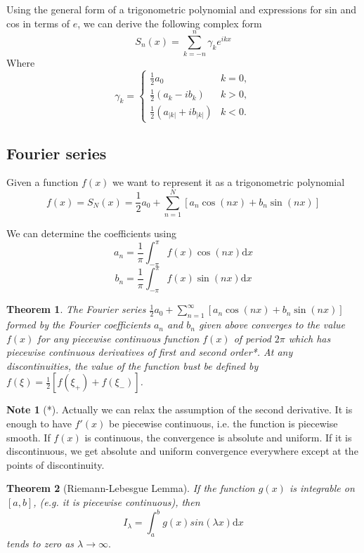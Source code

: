 \documentclass[11pt,a4paper]{article}
\newcommand\dee{\text{d}}
\newtheorem{theorem}{Theorem}
\theoremstyle{definition}
\newtheorem{note}{Note}
\begin{document}
Using the general form of a trigonometric polynomial and expressions for sin and cos in terms of $ e $, we can derive the following complex form 
\[ S_n(x) = \sum_{k = -n}^n \gamma_k e^{ikx}\]
Where
\[ \gamma_k = \begin{cases}
    \frac{1}{2} a_0 & k = 0, \\
    \frac{1}{2} (a_k - i b_k) & k > 0, \\
    \frac{1}{2} (a_{|k|} + i b_{|k|}) & k < 0.
\end{cases}\]

\subsection{Fourier series}
Given a function $ f(x) $ we want to represent it as a trigonometric polynomial
\[ f(x) = S_N(x) = \frac{1}{2} a_0 + \sum_{n = 1}^N \left[a_n \cos(nx) + b_n \sin(nx)\right] \]

We can determine the coefficients using
\[ a_n = \frac{1}{\pi} \int_{-\pi}^\pi f(x)\cos(nx) \dee x\]
\[ b_n = \frac{1}{\pi} \int_{-\pi}^\pi f(x)\sin(nx) \dee x\]

\begin{theorem}
    The Fourier series $ \frac{1}{2} a_0 + \sum_{n = 1}^\infty \left[a_n \cos(nx) + b_n \sin(nx)\right] $ formed by the Fourier coefficients $ a_n $ and $ b_n $ given above converges
    to the value $ f(x) $ for any piecewise continuous function $ f(x) $ of period $ 2\pi $ which has piecewise continuous derivatives of first and second order*. At any 
    discontinuities, the value of the function bust be defined by 
    $ f(\xi) = \frac{1}{2}\left[f(\xi_+) + f(\xi_-)\right] $.
\end{theorem}

\begin{note}[*]
   Actually we can relax the assumption of the second derivative. It is enough to have $ f'(x) $ be piecewise continuous, i.e. the function is piecewise smooth. If $ f(x) $ 
   is continuous, the convergence is absolute and uniform. If it is discontinuous, we get absolute and uniform convergence everywhere except at the points of discontinuity.
\end{note}

\begin{theorem}[Riemann-Lebesgue Lemma]
    If the function $ g(x) $ is integrable on $ [a, b] $, (e.g. it is piecewise continuous), then 
    \[ I_\lambda = \int_a^b g(x) sin(\lambda x) \dee x\]
    tends to zero as $ \lambda \to \infty. $ 
\end{theorem}
\end{document}
